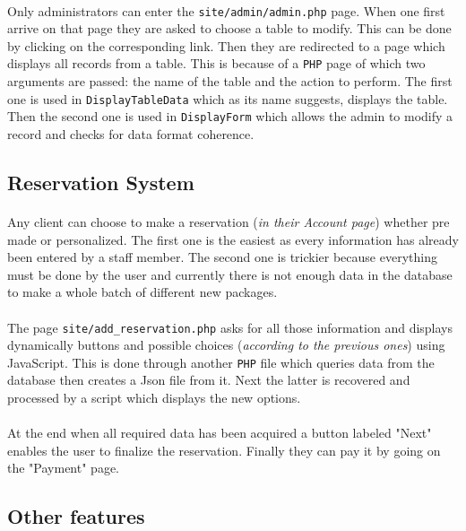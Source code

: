 \documentclass[11pt,a4paper,titlepage]{article}
\begin{document}
\paragraph{}
Only administrators can enter the \verb|site/admin/admin.php| page. When one first arrive on that page they are asked to choose a table to modify. This can be done by clicking on the corresponding link. Then they are redirected to a page which displays all records from a table. This is because of a \verb|PHP| page of which two arguments are passed: the name of the table and the action to perform. The first one is used in \verb|DisplayTableData| which as its name suggests, displays the table. Then the second one is used in \verb|DisplayForm| which allows the admin to modify a record and checks for data format coherence.

\subsection{Reservation System}
\paragraph{}
Any client can choose to make a reservation (\textit{in their Account page}) whether pre made or personalized. The first one is the easiest as every information has already been entered by a staff member. The second one is trickier because everything must be done by the user and currently there is not enough data in the database to make a whole batch of different new packages.
\paragraph{}
The page \verb|site/add_reservation.php| asks for all those information and displays dynamically buttons and possible choices (\textit{according to the previous ones}) using JavaScript. This is done through another \verb|PHP| file which queries data from the database then creates a Json file from it. Next the latter is recovered and processed by a script which displays the new options.
\paragraph{}
At the end when all required data has been acquired a button labeled "Next" enables the user to finalize the reservation. Finally they can pay it by going on the "Payment" page.

\subsection{Other features}
\end{document}
